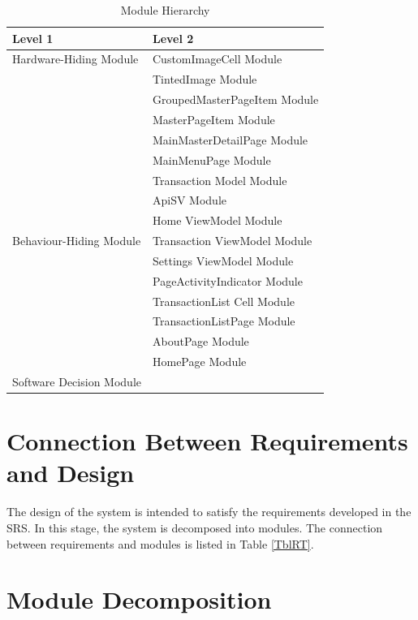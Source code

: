 \documentclass[12pt, titlepage]{article}
\begin{document}
\begin{table}[h!]
\centering
\begin{tabular}{p{} p{}}
\toprule
\textbf{Level 1} & \textbf{Level 2}\\
\midrule

{Hardware-Hiding Module} & CustomImageCell Module \\
& TintedImage Module\\
& GroupedMasterPageItem Module\\
& MasterPageItem Module\\
& MainMasterDetailPage Module\\
& MainMenuPage Module\\
\midrule

\multirow{7}{0.3\textwidth}{Behaviour-Hiding Module} & Transaction Model Module\\
& ApiSV Module\\
& Home ViewModel Module\\
& Transaction ViewModel Module\\
& Settings ViewModel Module\\
& PageActivityIndicator Module\\
& TransactionList Cell Module\\ 
& TransactionListPage Module\\
& AboutPage Module\\
& HomePage Module\\
\midrule

\multirow{1}{0.3\textwidth}{Software Decision Module} & {}\\
\bottomrule

\end{tabular}
\caption{Module Hierarchy}
\label{TblMH}
\end{table}

\section{Connection Between Requirements and Design} \label{SecConnection}

The design of the system is intended to satisfy the requirements developed in
the SRS. In this stage, the system is decomposed into modules. The connection
between requirements and modules is listed in Table \ref{TblRT}.

\section{Module Decomposition} \label{SecMD}
\end{document}
